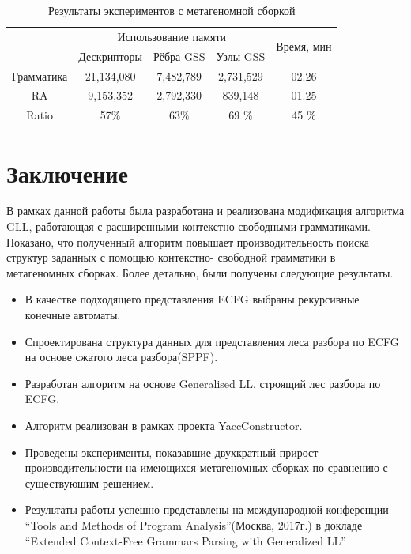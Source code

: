 \documentclass[14pt]{matmex-diploma-custom}
\begin{document}
    \begin{table}[h]
        \begin{tabular}{ | c | c | c | c | c | }
            \hline
            \multirow{2}{*}[-1ex]{} &\multicolumn{3}{c|}{Использование памяти} & \multirow{2}{*}[-1ex]{Время, мин } \\
            \cline{2-4}
            &  Дескрипторы & Рёбра GSS & Узлы GSS &  \\ \hline
            Грамматика  &  21,134,080       & 7,482,789      & 2,731,529      & 02.26  \\ \hline
            RA &  9,153,352        &  2,792,330     & 839,148        & 01.25  \\ \hline \hline
            Ratio   &  57$\%$       & 63$\%$     & 69 $\%$    &  45 $\%$ \\ \hline
        \end{tabular}
        \caption{Результаты экспериментов с метагеномной сборкой}
        \label{expTable1}
    \end{table}
	
	\section*{Заключение}
	В рамках данной работы была разработана и реализована модификация алгоритма GLL,
	работающая с расширенными контекстно-свободными грамматиками. Показано, что полученный
	алгоритм повышает производительность поиска структур заданных с помощью контекстно- свободной
	грамматики в метагеномных сборках. Более детально, были получены следующие результаты.
	\begin{itemize}
		\item В качестве подходящего представления ECFG выбраны рекурсивные конечные автоматы.
		\item Спроектирована структура данных для представления леса разбора по ECFG 
		на основе сжатого леса разбора(SPPF).
		\item Разработан алгоритм на основе Generalised LL, строящий лес разбора по ECFG.
		\item Алгоритм реализован в рамках проекта YaccConstructor.
		\item Проведены эксперименты, показавшие двухкратный прирост 
		производительности на имеющихся метагеномных сборках по сравнению 
		с существуюшим решением.
		\item Результаты работы успешно представлены на международной конференции
		``Tools and Methods of Program Analysis''(Москва, 2017г.) в докладе ``Extended Context-Free Grammars Parsing with Generalized LL''
	\end{itemize}
	
	\setmonofont[Mapping=tex-text]{CMU Typewriter Text}
	
	
	
\end{document}
